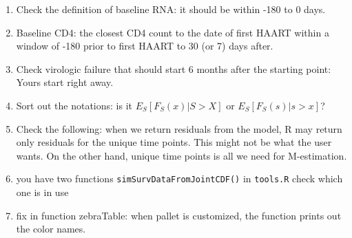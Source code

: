 \documentclass[]{article}
\begin{document}
\begin{enumerate}
  \item Check the definition of baseline RNA: it should be within -180 to 0 days.
  \item Baseline CD4: the  closest CD4 count to the date of first HAART within a window of -180 prior to first HAART to 30 (or 7) days after.
  \item Check virologic failure that should start 6 months after the starting point: Yours start right away.
  \item Sort out the notations: is it $E_S[F_S(x)|S>X]$ or $E_S[F_S(s)|s>x]$?
  \item Check the following: when we return residuals from the model, R may return only residuals for the unique time points. This might not be what the user wants. On the other hand, unique time points is all we need for M-estimation.
  \item you have two functions \texttt{simSurvDataFromJointCDF()} in \texttt{tools.R} check which one is in use
  \item fix in function zebraTable: when pallet is customized, the function prints out the color names.
\end{enumerate}

%


%
%
%
%
%
%
%
%


%

\printbibliography
\end{document}
